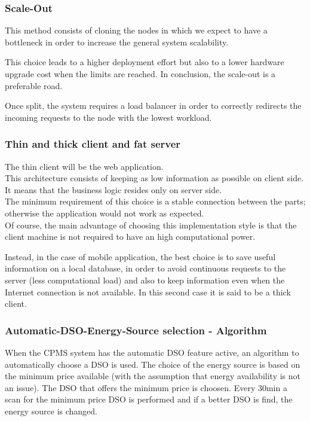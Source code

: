 \subsubsection{Scale-Out}
This method consists of cloning the nodes in which we expect to have a bottleneck in order to increase the general system scalability.

This choice leads to a higher deployment effort but also to a lower hardware upgrade cost when the limits are reached. In conclusion, the scale-out is a preferable road.

Once split, the system requires a load balancer in order to correctly redirects the incoming requests to the node with the lowest workload.

\subsubsection{Thin and thick client and fat server}
The thin client will be the web application.\\
This architecture consists of keeping as low information as possible on client side. It means that the business logic resides only on server side.\\
The minimum requirement of this choice is a stable connection between the parts; otherwise the application would not work as expected.\\
Of course, the main advantage of choosing this implementation style is that the client machine is not required to have an high computational power.

Instead, in the case of mobile application, the best choice is to save useful information on a local database, in order to avoid continuous requests to the server (less computational load) and also to keep information even when the Internet connection is not available. 
In this second case it is said to be a thick client.

\subsubsection{Automatic-DSO-Energy-Source selection - Algorithm}
When the CPMS system has the automatic DSO feature active, an algorithm to automatically choose a DSO is used. The choice of the energy source is based on the minimum price available (with the assumption that energy availability is not an issue). The DSO that offers the minimum price is choosen. Every 30min a scan for the minimum price DSO is performed and if a better DSO is find, the energy source is changed.


